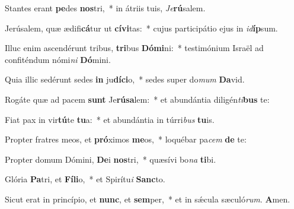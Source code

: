 ﻿\setcounter{versecount}{2}



\vs Stantes erant \textbf{pe}des \textbf{nos}tri,~* in átriis tuis, \textit{Je}\textbf{rú}salem.

\vs Jerúsalem, quæ ædifi\textbf{cá}tur ut \textbf{cí}\-\textbf{vi}\-tas:~* cujus participátio ejus in \textit{id}\textbf{íp}sum.

\vs Illuc enim ascendérunt tribus, \textbf{tri}bus \textbf{Dó}\textbf{mi}ni:~* testimónium Israël ad confiténdum nómi\textit{ni} \textbf{Dó}mini.

\vs Quia illic sedérunt sedes \textbf{in} ju\-\textbf{dí}\-\textbf{ci}\-o,~* sedes super do\textit{mum} \textbf{Da}vid.

\vs Rogáte quæ ad pacem \textbf{sunt} Je\-\textbf{rú}\-\textbf{sa}\-lem:~* et abundántia diligén\textit{ti}\textbf{bus} te:

\vs Fiat pax in vir\textbf{tú}te \textbf{tu}a:~* et abundántia in túrri\textit{bus} \textbf{tu}is.

\vs Propter fratres meos, et \textbf{pró}ximos \textbf{me}os,~* loquébar pa\textit{cem} \textbf{de} te:

\vs Propter domum Dómini, \textbf{De}i \textbf{nos}tri,~* quæsívi bo\textit{na} \textbf{ti}bi.

\vs Glória \textbf{Pa}tri, et \textbf{Fí}\textbf{li}o,~* et Spirítu\textit{i} \textbf{Sanc}to.

\vs Sicut erat in princípio, et \textbf{nunc}, et \textbf{sem}per,~* et in sǽcula sæculó\textit{rum}. \textbf{A}men.

